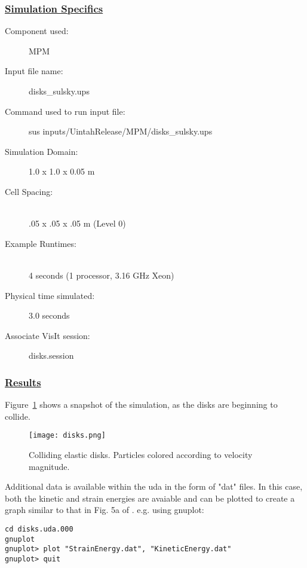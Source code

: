 \subsubsection*{\underline{Simulation Specifics}}
\begin{description} 
\item [Component used:] \hfill MPM
\item [Input file name:] \hfill disks\_sulsky.ups
\item [Command used to run input file:]\hfill \newline sus inputs/UintahRelease/MPM/disks\_sulsky.ups
\item [Simulation Domain:]\hfill    1.0 x 1.0 x 0.05 m

\item [Cell Spacing:]\hfill \\ 
.05 x .05 x .05 m (Level 0)

\item [Example Runtimes:] \hfill \\
 4 seconds  (1 processor, 3.16 GHz Xeon)\\

\item [Physical time simulated:] \hfill 3.0 seconds

\item [Associate VisIt session:] \hfill disks.session

\end{description}

\subsubsection*{\underline{Results}}

Figure~\ref{figdisks} shows a snapshot of the simulation, as the disks
are beginning to collide.
\begin{figure}
  \center
  \texttt{[image: disks.png]}
  \caption{Colliding elastic disks.  Particles colored according to
velocity magnitude.}
  \label{figdisks}
\end{figure}

Additional data is available within the uda in the form of "dat" files.
In this case, both the kinetic and strain energies are avaiable and can
be plotted to create a graph similar to that in Fig. 5a of \cite{sulskycmame}.
e.g. using gnuplot:

\begin{Verbatim}[fontsize=\footnotesize]
cd disks.uda.000
gnuplot
gnuplot> plot "StrainEnergy.dat", "KineticEnergy.dat"
gnuplot> quit
\end{Verbatim}
%
